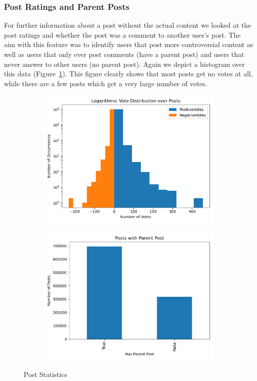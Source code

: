 \documentclass[acmsmall]{acmart}
\begin{document}
\subsubsection{Post Ratings and Parent Posts}
For further information about a post without the actual content we looked at the post ratings and whether the post was a comment to another user's post. The aim with this feature was to identify users that post more controversial content as well as users that only ever post comments (have a parent post) and users that never answer to other users (no parent post). Again we depict a histogram over this data (Figure~\ref{fig:post_stats}). This figure clearly shows that most posts get no votes at all, while there are a few posts which get a very large number of votes. 

\begin{figure}
\centering
\begin{subfigure}{.5\textwidth}
\centering
  \includegraphics[width=.9\linewidth]{assets/Logarithmic_Vote_Distribution_over_Posts.png}
 \end{subfigure}%
\begin{subfigure}{.5\textwidth}
\centering
  \includegraphics[width=.9\linewidth]{assets/Posts_with_parent_post.png}
 \end{subfigure}
 \caption{Post Statistics}
\label{fig:post_stats}
\end{figure}
\end{document}
